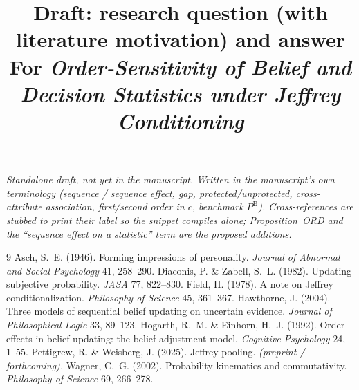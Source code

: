 \documentclass[11pt,a4paper]{article}
\title{Draft: research question (with literature motivation) and answer\\
\large For \emph{Order-Sensitivity of Belief and Decision Statistics under
Jeffrey Conditioning}}
\author{}
\date{}
\newcommand{\PB}{P^{\mathrm{B}}}
\begin{document}
\renewcommand{\ref}[1]{\textup{#1}}
\maketitle
\vspace{-2.4em}

\begin{center}\small\itshape
Standalone draft, not yet in the manuscript. Written in the manuscript's own
terminology (sequence / sequence effect, gap, protected/unprotected,
cross-attribute association, first/second order in $c$, benchmark $\PB$).
Cross-references are stubbed to print their label so the snippet compiles alone;
Proposition~ORD and the ``sequence effect on a statistic'' term are the proposed
additions.
\end{center}

\bigskip


\bigskip

\begin{thebibliography}{9}
Asch, S.~E. (1946). Forming impressions of
  personality. \emph{Journal of Abnormal and Social Psychology} 41, 258--290.
Diaconis, P. \& Zabell,
  S.~L. (1982). Updating subjective probability. \emph{JASA} 77, 822--830.
Field, H. (1978). A note on Jeffrey
  conditionalization. \emph{Philosophy of Science} 45, 361--367.
Hawthorne, J. (2004). Three models of
  sequential belief updating on uncertain evidence. \emph{Journal of
  Philosophical Logic} 33, 89--123.
Hogarth, R.~M. \& Einhorn,
  H.~J. (1992). Order effects in belief updating: the belief-adjustment model.
  \emph{Cognitive Psychology} 24, 1--55.
Pettigrew, R. \&
  Weisberg, J. (2025). Jeffrey pooling. \emph{(preprint / forthcoming).}
Wagner, C.~G. (2002). Probability kinematics
  and commutativity. \emph{Philosophy of Science} 69, 266--278.
\end{thebibliography}
\end{document}
